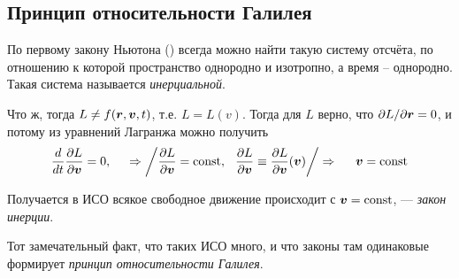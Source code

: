 \subsection{Принцип относительности Галилея}

\begin{to_def} 
    По первому закону Ньютона () всегда можно найти такую систему отсчёта, по отношению к которой пространство однородно и изотропно, а время -- однородно. Такая система называется \textit{инерциальной}.
\end{to_def}

Что ж, тогда $L \neq f(\mbox{\boldmath $r$}, \mbox{\boldmath $v$}, t)$, т.е. $L = L(v)$. Тогда для $L$ верно, что $\partial L / \partial \mbox{\boldmath $r$} = 0$, и потому из уравнений Лагранжа можно получить
$$
    \frac{d}{dt} \frac{\partial L}{\partial \mbox{\boldmath $v$}} = 0, 
    \hspace{0.5cm} 
    \Rightarrow
    \bigg/
    \frac{\partial L}{\partial \mbox{\boldmath $v$}} = \text{const},
    \hspace{0.25cm} 
    \frac{\partial L}{\partial \mbox{\boldmath $v$}} \equiv \frac{\partial L}{\partial \mbox{\boldmath $v$}} (\mbox{\boldmath $v$})
    \bigg/
    \Rightarrow
    \hspace{0.5cm} 
    \mbox{\boldmath $v$} = \text{const}    
$$

Получается в ИСО всякое свободное движение происходит с $\mbox{\boldmath $v$} = \text{const}$, --- \textit{закон инерции}.

Тот замечательный факт, что таких ИСО много, и что законы там одинаковые формирует \textit{принцип относительности Галилея}.
